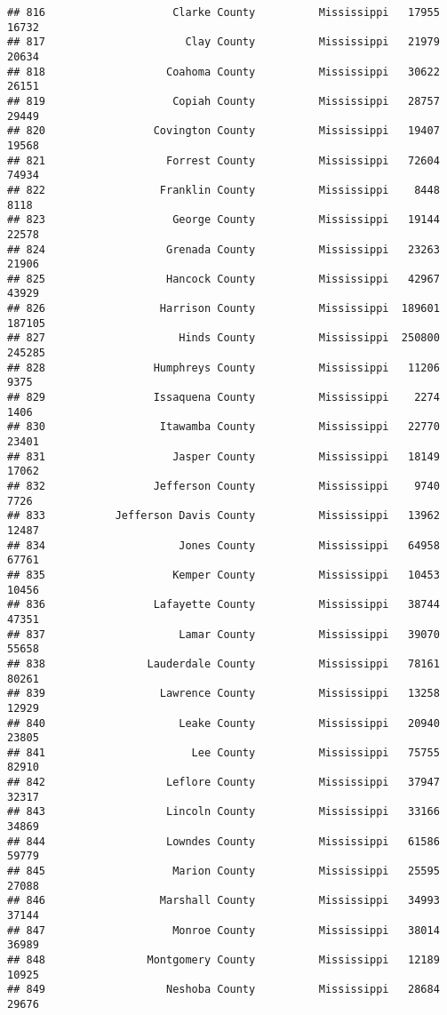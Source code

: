 \documentclass[
]{article}
\begin{document}
\begin{verbatim}
## 816                    Clarke County          Mississippi   17955   16732
## 817                      Clay County          Mississippi   21979   20634
## 818                   Coahoma County          Mississippi   30622   26151
## 819                    Copiah County          Mississippi   28757   29449
## 820                 Covington County          Mississippi   19407   19568
## 821                   Forrest County          Mississippi   72604   74934
## 822                  Franklin County          Mississippi    8448    8118
## 823                    George County          Mississippi   19144   22578
## 824                   Grenada County          Mississippi   23263   21906
## 825                   Hancock County          Mississippi   42967   43929
## 826                  Harrison County          Mississippi  189601  187105
## 827                     Hinds County          Mississippi  250800  245285
## 828                 Humphreys County          Mississippi   11206    9375
## 829                 Issaquena County          Mississippi    2274    1406
## 830                  Itawamba County          Mississippi   22770   23401
## 831                    Jasper County          Mississippi   18149   17062
## 832                 Jefferson County          Mississippi    9740    7726
## 833           Jefferson Davis County          Mississippi   13962   12487
## 834                     Jones County          Mississippi   64958   67761
## 835                    Kemper County          Mississippi   10453   10456
## 836                 Lafayette County          Mississippi   38744   47351
## 837                     Lamar County          Mississippi   39070   55658
## 838                Lauderdale County          Mississippi   78161   80261
## 839                  Lawrence County          Mississippi   13258   12929
## 840                     Leake County          Mississippi   20940   23805
## 841                       Lee County          Mississippi   75755   82910
## 842                   Leflore County          Mississippi   37947   32317
## 843                   Lincoln County          Mississippi   33166   34869
## 844                   Lowndes County          Mississippi   61586   59779
## 845                    Marion County          Mississippi   25595   27088
## 846                  Marshall County          Mississippi   34993   37144
## 847                    Monroe County          Mississippi   38014   36989
## 848                Montgomery County          Mississippi   12189   10925
## 849                   Neshoba County          Mississippi   28684   29676

\end{verbatim}
\end{document}
